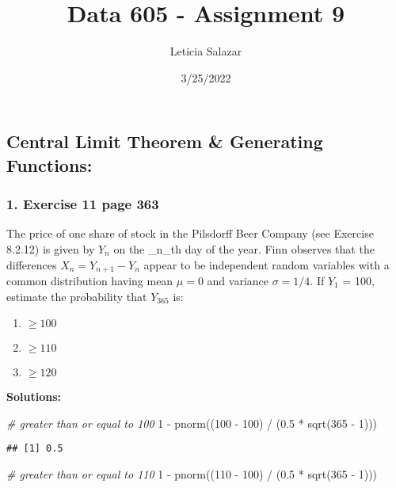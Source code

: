 \documentclass[
]{article}
\title{Data 605 - Assignment 9}
\author{Leticia Salazar}
\date{3/25/2022}
\newenvironment{Shaded}{\begin{snugshade}}{\end{snugshade}}
\newcommand{\CommentTok}[1]{\textcolor[rgb]{0.56,0.35,0.01}{\textit{#1}}}
\newcommand{\DecValTok}[1]{\textcolor[rgb]{0.00,0.00,0.81}{#1}}
\newcommand{\FloatTok}[1]{\textcolor[rgb]{0.00,0.00,0.81}{#1}}
\newcommand{\FunctionTok}[1]{\textcolor[rgb]{0.00,0.00,0.00}{#1}}
\newcommand{\NormalTok}[1]{#1}
\newcommand{\SpecialCharTok}[1]{\textcolor[rgb]{0.00,0.00,0.00}{#1}}
\begin{document}
\maketitle

{
\setcounter{tocdepth}{2}
\tableofcontents
}
\hypertarget{central-limit-theorem-generating-functions}{%
\subsection{Central Limit Theorem \& Generating
Functions:}\label{central-limit-theorem-generating-functions}}

\hypertarget{exercise-11-page-363}{%
\subsubsection{1. Exercise 11 page 363}\label{exercise-11-page-363}}

The price of one share of stock in the Pilsdorff Beer Company (see
Exercise 8.2.12) is given by \(Y_n\) on the \_n\_th day of the year.
Finn observes that the differences \(X_n = Y_{n + 1} - Y_n\) appear to
be independent random variables with a common distribution having mean
\(\mu = 0\) and variance \(\sigma = 1 / 4\). If \(Y_1\) = 100, estimate
the probability that \(Y_365\) is:

\begin{enumerate}
\def\labelenumi{(\alph{enumi})}
\item
  \(\ge 100\)
\item
  \(\ge 110\)
\item
  \(\ge 120\)
\end{enumerate}

\textbf{Solutions:}

\begin{Shaded}
\begin{Highlighting}[]
\CommentTok{\# greater than or equal to 100}
\DecValTok{1} \SpecialCharTok{{-}} \FunctionTok{pnorm}\NormalTok{((}\DecValTok{100} \SpecialCharTok{{-}} \DecValTok{100}\NormalTok{) }\SpecialCharTok{/}\NormalTok{ (}\FloatTok{0.5} \SpecialCharTok{*} \FunctionTok{sqrt}\NormalTok{(}\DecValTok{365} \SpecialCharTok{{-}} \DecValTok{1}\NormalTok{)))}
\end{Highlighting}
\end{Shaded}

\begin{verbatim}
## [1] 0.5
\end{verbatim}

\begin{Shaded}
\begin{Highlighting}[]
\CommentTok{\# greater than or equal to 110}
\DecValTok{1} \SpecialCharTok{{-}} \FunctionTok{pnorm}\NormalTok{((}\DecValTok{110} \SpecialCharTok{{-}} \DecValTok{100}\NormalTok{) }\SpecialCharTok{/}\NormalTok{ (}\FloatTok{0.5} \SpecialCharTok{*} \FunctionTok{sqrt}\NormalTok{(}\DecValTok{365} \SpecialCharTok{{-}} \DecValTok{1}\NormalTok{)))}
\end{Highlighting}
\end{Shaded}
\end{document}
